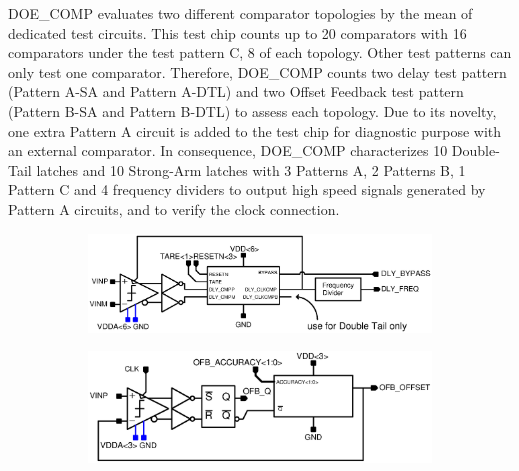 DOE\_COMP evaluates two different comparator topologies by the mean of dedicated test circuits. This test chip counts up to 20 comparators with 16 comparators under the test pattern C, 8 of each topology. Other test patterns can only test one comparator. Therefore, DOE\_COMP counts two delay test pattern (Pattern A-SA and Pattern A-DTL) and two Offset Feedback test pattern (Pattern B-SA and Pattern B-DTL) to assess each topology. Due to its novelty, one extra Pattern A circuit is added to the test chip for diagnostic purpose with an external comparator. In consequence, DOE\_COMP characterizes 10 Double-Tail latches and 10 Strong-Arm latches with 3 Patterns A, 2 Patterns B, 1 Pattern C and 4 frequency dividers to output high speed signals generated by Pattern A circuits, and to verify the clock connection. 

\begin{figure}[htp]
    \centering
    \begin{subfigure}[b]{0.5\textwidth}
        \includegraphics[width=\textwidth]{Chapter5/Figs/comp_test/test_delay_bloc_close_sa.ps}
    \end{subfigure}
    \begin{subfigure}[b]{0.5\textwidth}
        \includegraphics[width=\textwidth]{Chapter5/Figs/comp_test/test_offset_bloc_close_sa.ps}
    \end{subfigure}
    \begin{subfigure}[b]{0.75\textwidth}

\end{subfigure}
\end{figure}
